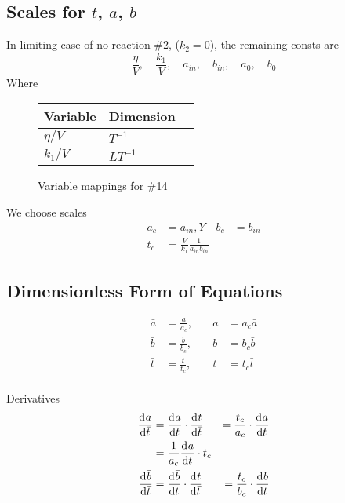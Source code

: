 \documentclass[12pt,twoside]{article}
\begin{document}
\subsection{Scales for $t$, $a$, $b$}
In limiting case of no reaction \#2, ($k_2=0$), the remaining consts are
\begin{equation}
  \frac{\eta}{V},\quad \frac{k_1}{V}, \quad a_{in}, \quad b_{in}, \quad a_0, \quad b_0
\end{equation}
Where
\begin{figure}
  \centering
  \begin{tabularx}{0.5\textwidth}{XXX}
    Variable & Dimension \\ \hline
    $\eta/V$ & $T^{-1}$  \\
    $k_1/V$ & $LT^{-1}$ \\
  \end{tabularx}
  \caption{Variable mappings for \#14}
  \label{fig:14-var-mappings}
\end{figure}
We choose scales
\begin{equation}
  \begin{aligned}
    a_c &= a_{in}, Y\quad b_c &= b_{in} \\
    t_c &= \frac{V}{k_1}\frac{1}{a_{in}b_{in}}
  \end{aligned}
\end{equation}

\subsection{Dimensionless Form of Equations}
\begin{equation}
  \begin{aligned}
    \bar{a} &= \frac{a}{a_c}, &\quad a &= a_c\bar{a} \\
    \bar{b} &= \frac{b}{b_c}, &\quad b &= b_c\bar{b} \\
    \bar{t} &= \frac{t}{t_c}, &\quad t &= t_c\bar{t} \\
  \end{aligned}
\end{equation}

Derivatives
\begin{equation}
  \begin{aligned}
    \frac{\mathrm{d}^{} {\bar{a}}}{\mathrm{d}{\bar{t}}^{}} &= \frac{\mathrm{d}^{} {\bar{a}}}{\mathrm{d}{t}^{}} \cdot \frac{\mathrm{d}^{} {t}}{\mathrm{d}{\bar{t}}^{}} &= \frac{t_c}{a_c}\cdot\frac{\mathrm{d}^{} {a}}{\mathrm{d}{t}^{}} \\
    &= \frac{1}{a_c}\frac{\mathrm{d}^{} {a}}{\mathrm{d}{t}^{}} \cdot t_c \\
    \frac{\mathrm{d}^{} {\bar{b}}}{\mathrm{d}{\bar{t}}^{}} &= \frac{\mathrm{d}^{} {\bar{b}}}{\mathrm{d}{t}^{}} \cdot \frac{\mathrm{d}^{} {t}}{\mathrm{d}{\bar{t}}^{}} &= \frac{t_c}{b_c}\cdot\frac{\mathrm{d}^{} {b}}{\mathrm{d}{t}^{}} \\
  \end{aligned}
\end{equation}
\end{document}
